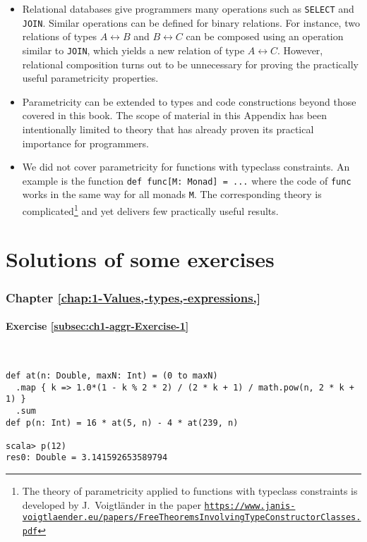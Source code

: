 \begin{itemize}
\item Relational databases give programmers many operations such as \lstinline!SELECT!
and \lstinline!JOIN!. Similar operations can be defined for binary
relations. For instance, two relations of types $A\leftrightarrow B$
and $B\leftrightarrow C$ can be composed using an operation similar
to \lstinline!JOIN!, which yields a new relation of type $A\leftrightarrow C$.
However, relational composition turns out to be unnecessary for proving
the practically useful parametricity properties.
\item Parametricity can be extended to types and code constructions beyond
those covered in this book. The scope of material in this Appendix
has been intentionally limited to theory that has already proven its
practical importance for programmers. 
\item We did not cover parametricity for functions with typeclass constraints.
An example is the function \lstinline!def func[M: Monad] = ...! where
the code of \lstinline!func! works in the same way for all monads
\lstinline!M!. The corresponding theory is complicated\footnote{The theory of parametricity applied to functions with typeclass constraints
is developed by J.~Voigtl\"ander
in the paper \texttt{\href{https://www.janis-voigtlaender.eu/papers/FreeTheoremsInvolvingTypeConstructorClasses.pdf}{https://www.janis-voigtlaender.eu/papers/FreeTheoremsInvolvingTypeConstructorClasses.pdf}}} and yet delivers few practically useful results.
\end{itemize}

\chapter{Solutions of some exercises}

\subsection*{Chapter \ref{chap:1-Values,-types,-expressions,}}

\subsubsection*{Exercise \ref{subsec:ch1-aggr-Exercise-1}}

~
\begin{lstlisting}
def at(n: Double, maxN: Int) = (0 to maxN)
  .map { k => 1.0*(1 - k % 2 * 2) / (2 * k + 1) / math.pow(n, 2 * k + 1) }
  .sum
def p(n: Int) = 16 * at(5, n) - 4 * at(239, n)

scala> p(12)
res0: Double = 3.141592653589794
\end{lstlisting}


